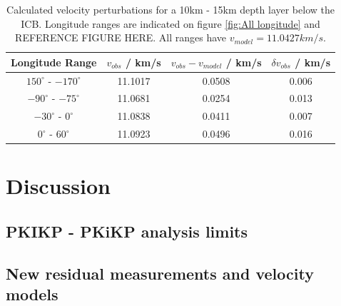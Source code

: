 \documentclass[11pt,a4paper]{article}
\begin{document}
\begin{table}
\centering
\begin{tabular}{| c | c | c | c |}
	\hline
	Longitude Range			& $v_{obs}$ / km/s	& $v_{obs} - v_{model}$ / km/s	& $\delta v_{obs}$ / km/s	\\ \hline \hline
	$150^{\circ}$ - $-170^{\circ}$	& 11.1017			& 0.0508					& 0.006				\\ \hline
	$-90^{\circ}$ - $-75^{\circ}$	& 11.0681			& 0.0254					& 0.013				\\ \hline
	$-30^{\circ}$ - $0^{\circ}$		& 11.0838			& 0.0411					& 0.007				\\ \hline
	$0^{\circ}$ - $60^{\circ}$		& 11.0923			& 0.0496					& 0.016				\\
	\hline
\end{tabular}
\caption{Calculated velocity perturbations for a 10km - 15km depth layer below the ICB. Longitude ranges are indicated on figure \ref{fig:All longitude} and REFERENCE FIGURE HERE. All ranges have $v_{model} = 11.0427 km/s$.}
\label{tab:Velocity models}
\end{table}

\section{Discussion}

\subsection{PKIKP - PKiKP analysis limits}

\subsection{New residual measurements and velocity models}



\end{document}
